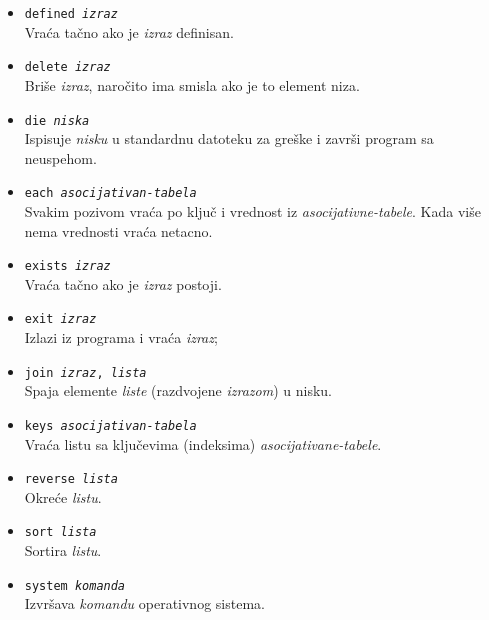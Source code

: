 \documentclass[12pt,a4paper]{article}
\begin{document}
        \begin{itemize}
        \item
          {\tt defined {\it izraz}}\\
          Vra\'ca ta\v cno ako je {\it izraz} definisan.
        \item
          {\tt delete {\it izraz}}\\
          Bri\v se {\it izraz}, naro\v cito ima smisla ako je to element niza.
        \item
          {\tt die {\it niska}}\\
          Ispisuje {\it nisku} u standardnu datoteku za gre\v ske i zavr\v si
          program sa neuspehom.
        \item
          {\tt each {\it asocijativan-tabela}}\\
          Svakim pozivom vra\'ca po klju\v c i vrednost iz
          {\it asocijativne-tabele}.
          Kada vi\v se nema vrednosti vra\'ca netacno.
        \item
          {\tt exists {\it izraz}}\\
          Vra\'ca ta\v cno ako je {\it izraz} postoji.
        \item
          {\tt exit {\it izraz}}\\
          Izlazi iz programa i vra\'ca {\it izraz};
        \item
          {\tt join {\it izraz}, {\it lista}}\\
          Spaja elemente {\it liste} (razdvojene {\it izrazom}) u nisku.
        \item
          {\tt keys {\it asocijativan-tabela}}\\
          Vra\'ca listu sa klju\v cevima (indeksima)
          {\it asocijativane-tabele}.
        \item
          {\tt reverse {\it lista}}\\
          Okre\'ce {\it listu}.
        \item
          {\tt sort {\it lista}}\\
          Sortira {\it listu}.
        \item
          {\tt system {\it komanda}}\\
          Izvr\v sava {\it komandu} operativnog sistema.
        \end{itemize}
\end{document}
